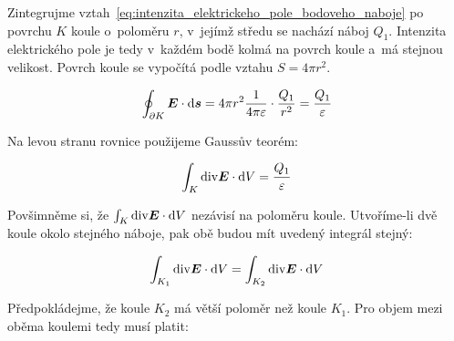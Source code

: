 
Zintegrujme vztah~\eqref{eq:intenzita_elektrickeho_pole_bodoveho_naboje} po povrchu \(K\) koule o~poloměru \(r\), v~jejímž středu se nachází náboj \(Q_1\). Intenzita elektrického pole je tedy v~každém bodě kolmá na povrch koule a~má stejnou velikost. Povrch koule se vypočítá podle vztahu \(S = 4 \pi r^2\).

\begin{equation}
\oint_{\partial K} \boldsymbol{E} \cdot \mathrm{d}\boldsymbol{s} = 4 \pi r^2 \frac{1}{4 \pi \varepsilon} \cdot \frac{Q_1}{r^2} = \frac{Q_1}{\varepsilon}
\end{equation}

Na levou stranu rovnice použijeme Gaussův teorém: 

\begin{equation}
\int_{K} \mathrm{div} \boldsymbol{E} \cdot \mathrm{d}V = \frac{Q_1}{\varepsilon}
\end{equation}

Povšimněme si, že \(\int_{K} \mathrm{div} \boldsymbol{E} \cdot \mathrm{d}V\) nezávisí na poloměru koule. Utvoříme-li dvě koule okolo stejného náboje, pak obě budou mít uvedený integrál stejný:

\begin{equation}
\int_{K_1} \mathrm{div} \boldsymbol{E} \cdot \mathrm{d}V = \int_{K_2} \mathrm{div} \boldsymbol{E} \cdot \mathrm{d}V
\end{equation}

Předpokládejme, že koule \(K_2\) má větší poloměr než koule \(K_1\). Pro objem mezi oběma koulemi tedy musí platit:

